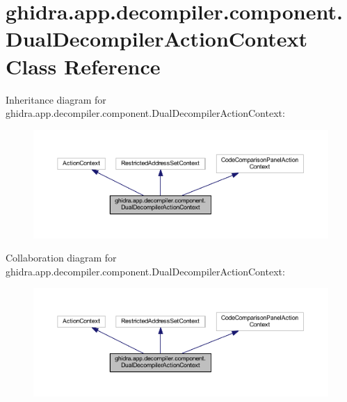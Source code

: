 \hypertarget{classghidra_1_1app_1_1decompiler_1_1component_1_1_dual_decompiler_action_context}{}\section{ghidra.\+app.\+decompiler.\+component.\+Dual\+Decompiler\+Action\+Context Class Reference}
\label{classghidra_1_1app_1_1decompiler_1_1component_1_1_dual_decompiler_action_context}


Inheritance diagram for ghidra.\+app.\+decompiler.\+component.\+Dual\+Decompiler\+Action\+Context\+:
\nopagebreak
\begin{figure}[H]
\begin{center}
\leavevmode
\includegraphics[width=350pt]{classghidra_1_1app_1_1decompiler_1_1component_1_1_dual_decompiler_action_context__inherit__graph}
\end{center}
\end{figure}


Collaboration diagram for ghidra.\+app.\+decompiler.\+component.\+Dual\+Decompiler\+Action\+Context\+:
\nopagebreak
\begin{figure}[H]
\begin{center}
\leavevmode
\includegraphics[width=350pt]{classghidra_1_1app_1_1decompiler_1_1component_1_1_dual_decompiler_action_context__coll__graph}
\end{center}
\end{figure}
